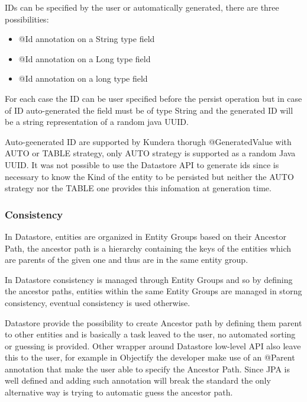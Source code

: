 IDs can be specified by the user or automatically generated, there are three possibilities:
\begin{itemize}
\item @Id annotation on a String type field
\item @Id annotation on a Long type field
\item @Id annotation on a long type field
\end{itemize}
For each case the ID can be user specified before the persist operation but in case of ID auto-generated the field must be of type String and the generated ID will be a string representation of a random java UUID.

Auto-geenerated ID are supported by Kundera thorugh @GeneratedValue with AUTO or TABLE strategy, only AUTO strategy is supported as a random Java UUID. It was not possible to use the Datastore API to generate ids since is necessary to know the Kind of the entity to be persisted but neither the AUTO strategy nor the TABLE one provides this infomation at generation time.

\subsubsection{Consistency}
In Datastore, entities are organized in Entity Groups based on their Ancestor Path, the ancestor path is a hierarchy containing the keys of the entities which are parents of the given one and thus are in the same entity group.

In Datastore consistency is managed through Entity Groups and so by defining the ancestor paths, entities within the same Entity Groups are managed in storng consistency, eventual consistency is used otherwise.

Datastore provide the possibility to create Ancestor path by defining them parent to other entities and is basically a task leaved to the user, no automated sorting or guessing is provided. Other wrapper around Datastore low-level API also leave this to the user, for example in Objectify the developer make use of an @Parent annotation that make the user able to specify the Ancestor Path.
Since JPA is well defined and adding such annotation will break the standard the only alternative way is trying to automatic guess the ancestor path.

